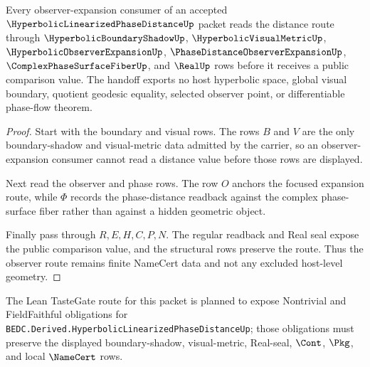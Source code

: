 \begin{theorem}
\label{thm:hyperbolic-linearized-phase-distance-observer-route}
Every observer-expansion consumer of an accepted $\HyperbolicLinearizedPhaseDistanceUp$ packet reads the distance route through $\HyperbolicBoundaryShadowUp$, $\HyperbolicVisualMetricUp$, $\HyperbolicObserverExpansionUp$, $\PhaseDistanceObserverExpansionUp$, $\ComplexPhaseSurfaceFiberUp$, and $\RealUp$ rows before it receives a public comparison value. The handoff exports no host hyperbolic space, global visual boundary, quotient geodesic equality, selected observer point, or differentiable phase-flow theorem.
\end{theorem}
\begin{proof}
Start with the boundary and visual rows. The rows $B$ and $V$ are the only boundary-shadow and visual-metric data admitted by the carrier, so an observer-expansion consumer cannot read a distance value before those rows are displayed.

Next read the observer and phase rows. The row $O$ anchors the focused expansion route, while $\Phi$ records the phase-distance readback against the complex phase-surface fiber rather than against a hidden geometric object.

Finally pass through $R,E,H,C,P,N$. The regular readback and Real seal expose the public comparison value, and the structural rows preserve the route. Thus the observer route remains finite NameCert data and not any excluded host-level geometry.
\end{proof}



The Lean TasteGate route for this packet is planned to expose Nontrivial and FieldFaithful obligations for \texttt{BEDC.Derived.HyperbolicLinearizedPhaseDistanceUp}; those obligations must preserve the displayed boundary-shadow, visual-metric, Real-seal, $\Cont$, $\Pkg$, and local $\NameCert$ rows.

